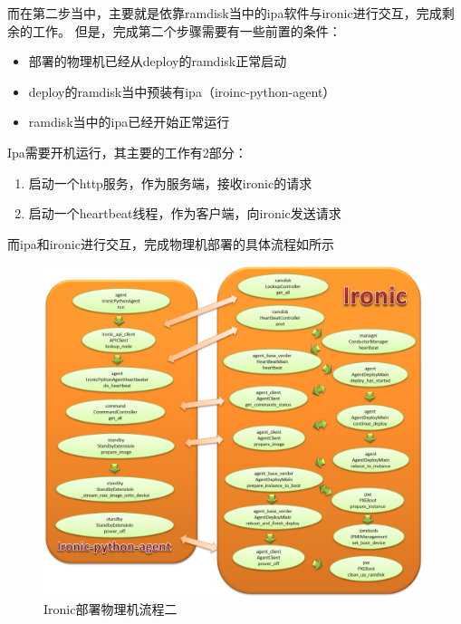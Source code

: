 而在第二步当中，主要就是依靠ramdisk当中的ipa软件与ironic进行交互，完成剩余的工作。
但是，完成第二个步骤需要有一些前置的条件：
\begin{itemize}
  \item 部署的物理机已经从deploy的ramdisk正常启动
  \item deploy的ramdisk当中预装有ipa（iroinc-python-agent）
  \item ramdisk当中的ipa已经开始正常运行
\end{itemize}

Ipa需要开机运行，其主要的工作有2部分：
\begin{enumerate}
  \item 启动一个http服务，作为服务端，接收ironic的请求
  \item 启动一个heartbeat线程，作为客户端，向ironic发送请求
\end{enumerate}

而ipa和ironic进行交互，完成物理机部署的具体流程如所示
\begin{figure}[H]
  \centering
  \includegraphics[scale=0.3]{ironic_workflow2.png}
  \caption{Ironic部署物理机流程二}
  \label{fig:step2}
\end{figure}

